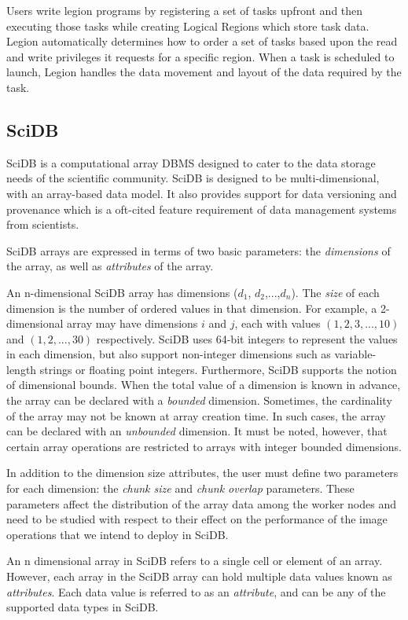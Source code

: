 \documentclass[tog]{acmsiggraph}
\begin{document}
Users write legion programs by registering a set of tasks upfront and then
executing those tasks while creating Logical Regions which store task
data. Legion automatically determines how to order a set of tasks based upon
the read and write privileges it requests for a specific region. When a task is
scheduled to launch, Legion handles the data movement and layout of the data
required by the
task.

\subsection{SciDB}
SciDB\cite{stonebraker2013scidb} is a computational array DBMS designed to
cater to the data storage needs of the scientific community. SciDB is designed
to be multi-dimensional, with an array-based data model. It also provides
support for data versioning and provenance which is a oft-cited feature
requirement of data management systems from scientists.

SciDB arrays are expressed in terms of two basic parameters: the {\em
dimensions} of the array, as well as {\em attributes} of the array.

An n-dimensional SciDB array has dimensions ($d_{1}$,
$d_{2}$,$...$,$d_{n}$). The {\em size} of each dimension is the number of
ordered values in that dimension. For example, a 2-dimensional array may have
dimensions $i$ and $j$, each with values $(1, 2, 3, ..., 10)$ and $(1, 2, ...,
30)$ respectively. SciDB uses 64-bit integers to represent the values in each
dimension, but also support non-integer dimensions such as variable-length
strings or floating point integers. Furthermore, SciDB supports the notion of
dimensional bounds. When the total value of a dimension is known in advance,
the array can be declared with a {\em bounded} dimension. Sometimes, the
cardinality of the array may not be known at array creation time. In such
cases, the array can be declared with an {\em unbounded} dimension. It must be
noted, however, that certain array operations are restricted to arrays with
integer bounded dimensions.

In addition to the dimension size attributes, the user must define two
parameters for each dimension: the {\em chunk size} and {\em chunk overlap}
parameters. These parameters affect the distribution of the array data among
the worker nodes and need to be studied with respect to their effect on the
performance of the image operations that we intend to deploy in SciDB.

An n dimensional array in SciDB refers to a single cell or element of an
array. However, each array in the SciDB array can hold multiple data values
known as {\em attributes}. Each data value is referred to as an {\em
attribute}, and can be any of the supported data types in SciDB.
\end{document}
